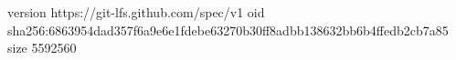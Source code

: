 version https://git-lfs.github.com/spec/v1
oid sha256:6863954dad357f6a9e6e1fdebe63270b30ff8adbb138632bb6b4ffedb2cb7a85
size 5592560
